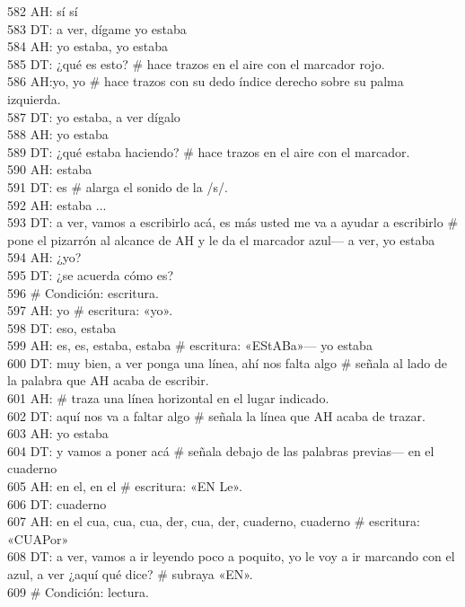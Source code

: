 582 AH: sí sí\\
583 DT: a ver, dígame yo estaba\\
584 AH: yo estaba, yo estaba\\
585 DT: ¿qué es esto? \# hace trazos en el aire con el marcador rojo.\\
586 AH:yo, yo \# hace trazos con su dedo índice derecho sobre su palma izquierda.\\
587 DT: yo estaba, a ver dígalo\\
588 AH: yo estaba\\
589 DT: ¿qué estaba haciendo? \# hace trazos en el aire con el marcador.\\
590 AH: estaba\\
591 DT: es \# alarga el sonido de la /s/.\\
592 AH: estaba ...\\
593 DT: a ver, vamos a escribirlo acá, es más usted me va a ayudar a escribirlo \# pone el pizarrón al alcance de AH y le da el marcador azul--- a ver, yo estaba\\
594 AH: ¿yo?\\
595 DT: ¿se acuerda cómo es?\\
596 \# Condición: escritura.\\
597 AH: yo \# escritura: «yo».\\
598 DT: eso, estaba\\
599 AH: es, es, estaba, estaba \# escritura: «EStABa»--- yo estaba\\
600 DT: muy bien, a ver ponga una línea, ahí nos falta algo \# señala al lado de la palabra que AH acaba de escribir.\\
601 AH: \# traza una línea horizontal en el lugar indicado.\\
602 DT: aquí nos va a faltar algo \# señala la línea que AH acaba de trazar.\\
603 AH: yo estaba\\
604 DT: y vamos a poner acá \# señala debajo de las palabras previas--- en el cuaderno\\
605 AH: en el, en el \# escritura: «EN Le».\\
606 DT: cuaderno\\
607 AH: en el cua, cua, cua, der, cua, der, cuaderno, cuaderno \# escritura: «CUAPor»\\
608 DT: a ver, vamos a ir leyendo poco a poquito, yo le voy a ir marcando con el azul, a ver ¿aquí qué dice? \# subraya «EN».\\
609 \# Condición: lectura.\\
